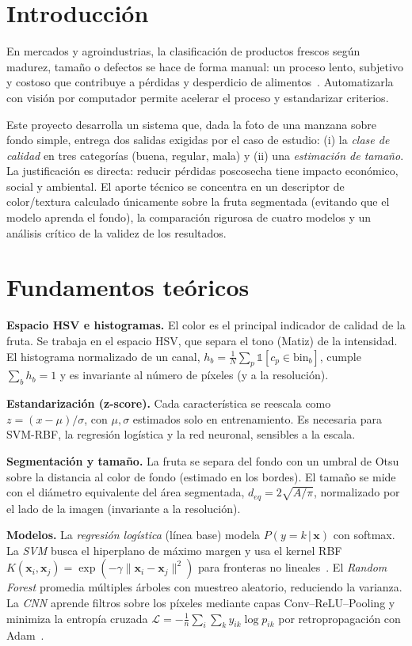 \documentclass[conference]{IEEEtran}
\begin{document}
\section{Introducción}
En mercados y agroindustrias, la clasificación de productos frescos según
madurez, tamaño o defectos se hace de forma manual: un proceso lento, subjetivo y
costoso que contribuye a pérdidas y desperdicio de alimentos~\cite{fao}.
Automatizarla con visión por computador permite acelerar el proceso y
estandarizar criterios.

Este proyecto desarrolla un sistema que, dada la foto de una manzana sobre fondo
simple, entrega dos salidas exigidas por el caso de estudio: (i) la \emph{clase
de calidad} en tres categorías (buena, regular, mala) y (ii) una \emph{estimación
de tamaño}. La justificación es directa: reducir pérdidas poscosecha tiene
impacto económico, social y ambiental. El aporte técnico se concentra en un
descriptor de color/textura calculado únicamente sobre la fruta segmentada
(evitando que el modelo aprenda el fondo), la comparación rigurosa de cuatro
modelos y un análisis crítico de la validez de los resultados.

\section{Fundamentos teóricos}
\label{sec:fundamentos}
\textbf{Espacio HSV e histogramas.} El color es el principal indicador de calidad
de la fruta. Se trabaja en el espacio HSV, que separa el tono (Matiz) de la
intensidad. El histograma normalizado de un canal, $h_b=\frac{1}{N}\sum_p
\mathbb{1}[c_p\in\text{bin}_b]$, cumple $\sum_b h_b=1$ y es invariante al número
de píxeles (y a la resolución).

\textbf{Estandarización (z-score).} Cada característica se reescala como
$z=(x-\mu)/\sigma$, con $\mu,\sigma$ estimados solo en entrenamiento. Es
necesaria para SVM-RBF, la regresión logística y la red neuronal, sensibles a la
escala.

\textbf{Segmentación y tamaño.} La fruta se separa del fondo con un umbral de
Otsu sobre la distancia al color de fondo (estimado en los bordes). El tamaño se
mide con el diámetro equivalente del área segmentada, $d_{eq}=2\sqrt{A/\pi}$,
normalizado por el lado de la imagen (invariante a la resolución).

\textbf{Modelos.} La \emph{regresión logística} (línea base) modela
$P(y{=}k\,|\,\mathbf{x})$ con softmax. La \emph{SVM} busca el hiperplano de
máximo margen y usa el kernel RBF
$K(\mathbf{x}_i,\mathbf{x}_j)=\exp(-\gamma\lVert\mathbf{x}_i-\mathbf{x}_j\rVert^2)$
para fronteras no lineales~\cite{cortes}. El \emph{Random Forest} promedia
múltiples árboles con muestreo aleatorio, reduciendo la varianza. La \emph{CNN}
aprende filtros sobre los píxeles mediante capas Conv--ReLU--Pooling y minimiza
la entropía cruzada $\mathcal{L}=-\frac1n\sum_i\sum_k y_{ik}\log p_{ik}$ por
retropropagación con Adam~\cite{kingma}.
\end{document}
